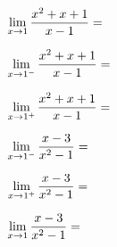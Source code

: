 \documentclass{ximera}
\begin{document}
\begin{exercise}
\begin{question}
\begin{feedback}[1>0]
			\end{feedback}
		\end{question}
		\begin{question} \def\isE{correct}   $\limxg{1}    \dfrac{x^2+x+1}{x-1}= \;$            \localoefoptions \end{question}
		\begin{question} \def\isB{correct}   $\llimxg{1}    \dfrac{x^2+x+1}{x-1}= \;$            \localoefoptions \end{question}
		\begin{question} \def\isA{correct}   $\rlimxg{1}    \dfrac{x^2+x+1}{x-1}= \;$            \localoefoptions \end{question}
		\begin{question} \def\isA{correct}   $\llimxg{1}    \dfrac{x-3}{x^2-1}= \;$            \localoefoptions \end{question}
		\begin{question} \def\isB{correct}   $\rlimxg{1}    \dfrac{x-3}{x^2-1}= \;$            \localoefoptions \end{question}
		\begin{question} \def\isE{correct}   $\limxg{1}    \dfrac{x-3}{x^2-1}= \;$            \localoefoptions \end{question}
				
\end{exercise}
\end{document}

